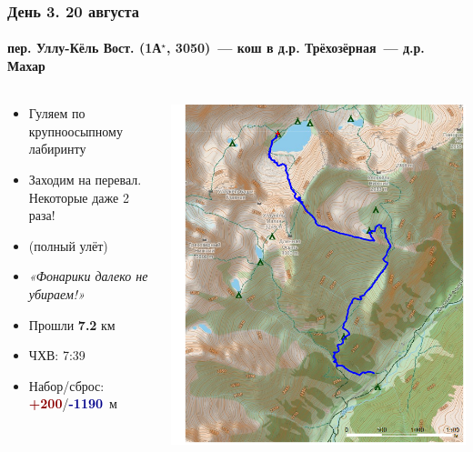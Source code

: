 	\begin{frame}
	\frametitle{День 3. 20 августа}
	\framesubtitle{\textbf{пер. Уллу-Кёль Вост. (1А$^\star$, 3050)}~--- кош в д.р. Трёхозёрная~--- д.р. Махар} %
	\begin{columns}[c] %
		\begin{column}{0.45\textwidth} %
			\begin{itemize}
				\item Гуляем по крупноосыпному лабиринту
				\item Заходим на перевал. Некоторые даже 2 раза!
				\item (полный улёт)
				\item \textit{«Фонарики далеко не убираем!»}
				\item Прошли \textbf{7.2} км
				\item ЧХВ: 7:39
				\item Набор/сброс: \textcolor{darkred}{\textbf{+200}}/\textcolor{darkblue}{\textbf{-1190}}~м
			\end{itemize}
			
		\end{column}
		\begin{column}{0.5\textwidth} %
			\centering
			\includegraphics[width=\linewidth]{../pics/mini_maps/20}
		\end{column}
	\end{columns}
\end{frame}

